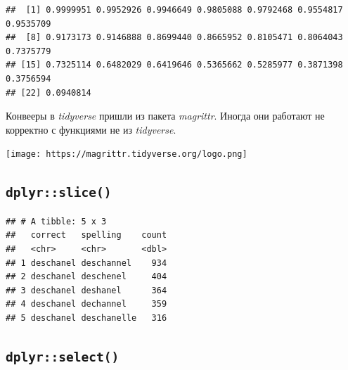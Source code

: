 \documentclass[]{book}
\newenvironment{Shaded}{\begin{snugshade}}{\end{snugshade}}
\newcommand{\CommentTok}[1]{\textcolor[rgb]{0.56,0.35,0.01}{\textit{#1}}}
\newcommand{\DataTypeTok}[1]{\textcolor[rgb]{0.13,0.29,0.53}{#1}}
\newcommand{\DecValTok}[1]{\textcolor[rgb]{0.00,0.00,0.81}{#1}}
\newcommand{\KeywordTok}[1]{\textcolor[rgb]{0.13,0.29,0.53}{\textbf{#1}}}
\newcommand{\NormalTok}[1]{#1}
\newcommand{\OperatorTok}[1]{\textcolor[rgb]{0.81,0.36,0.00}{\textbf{#1}}}
\newcommand{\OtherTok}[1]{\textcolor[rgb]{0.56,0.35,0.01}{#1}}
\newcommand{\StringTok}[1]{\textcolor[rgb]{0.31,0.60,0.02}{#1}}
\begin{document}
\begin{Shaded}
\end{Shaded}

\begin{verbatim}
##  [1] 0.9999951 0.9952926 0.9946649 0.9805088 0.9792468 0.9554817 0.9535709
##  [8] 0.9173173 0.9146888 0.8699440 0.8665952 0.8105471 0.8064043 0.7375779
## [15] 0.7325114 0.6482029 0.6419646 0.5365662 0.5285977 0.3871398 0.3756594
## [22] 0.0940814
\end{verbatim}

Конвееры в \emph{tidyverse} пришли из пакета \emph{magrittr}. Иногда они работают не корректно с функциями не из \emph{tidyverse}.

\texttt{[image: https://magrittr.tidyverse.org/logo.png]}

\hypertarget{dplyrslice}{%
\subsection{\texorpdfstring{\texttt{dplyr::slice()}}{dplyr::slice()}}\label{dplyrslice}}

\begin{Shaded}
\end{Shaded}

\begin{verbatim}
## # A tibble: 5 x 3
##   correct   spelling    count
##   <chr>     <chr>       <dbl>
## 1 deschanel deschannel    934
## 2 deschanel deschenel     404
## 3 deschanel deshanel      364
## 4 deschanel dechannel     359
## 5 deschanel deschanelle   316
\end{verbatim}

\hypertarget{dplyrselect}{%
\subsection{\texorpdfstring{\texttt{dplyr::select()}}{dplyr::select()}}\label{dplyrselect}}
\end{document}
